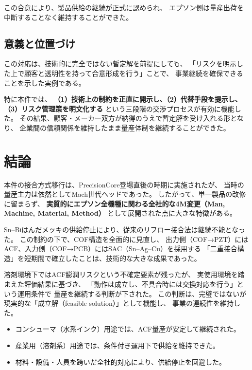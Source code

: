 \documentclass[conference]{IEEEtran}
\begin{document}
この合意により、製品供給の継続が正式に認められ、  
エプソン側は量産出荷を中断することなく維持することができた。

\subsection{意義と位置づけ}
この対応は、技術的に完全ではない暫定解を前提にしても、  
「リスクを明示した上で顧客と透明性を持って合意形成を行う」ことで、  
事業継続を確保できることを示した実例である。  

特に本件では、  
\textbf{（1）技術上の制約を正直に開示し、（2）代替手段を提示し、（3）リスク管理策を明文化する}  
という三段階の交渉プロセスが有効に機能した。  
その結果、顧客・メーカー双方が納得のうえで暫定解を受け入れる形となり、  
企業間の信頼関係を維持したまま量産体制を継続することができた。

\section{結論}

本件の接合方式移行は、PrecisionCore登場直後の時期に実施されたが、  
当時の量産主力は依然としてMach世代ヘッドであった。  
したがって、単一製品の改修に留まらず、  
\textbf{実質的にエプソン全機種に関わる全社的な4M変更（Man, Machine, Material, Method）}  
として展開された点に大きな特徴がある。  

Sn–Biはんだメッキの供給停止により、従来のリフロー接合法は継続不能となった。  
この制約の下で、COF構造を全面的に見直し、  
出力側（COF→PZT）にはACF、入力側（COF→PCB）にはSAC（Sn–Ag–Cu）を採用する  
「二重接合構造」を短期間で確立したことは、技術的な大きな成果であった。  

溶剤環境下ではACF膨潤リスクという不確定要素が残ったが、  
実使用環境を踏まえた評価結果に基づき、  
「動作は成立し、不具合時には交換対応を行う」という運用条件で  
量産を継続する判断が下された。  
この判断は、完璧ではないが現実的な「成立解（feasible solution）」として機能し、  
事業の連続性を維持した。

\begin{itemize}
  \item コンシューマ（水系インク）用途では、ACF量産が安定して継続された。  
  \item 産業用（溶剤系）用途では、条件付き運用下で供給を維持できた。  
  \item 材料・設備・人員を跨いだ全社的対応により、供給停止を回避した。  
\end{itemize}
\end{document}
